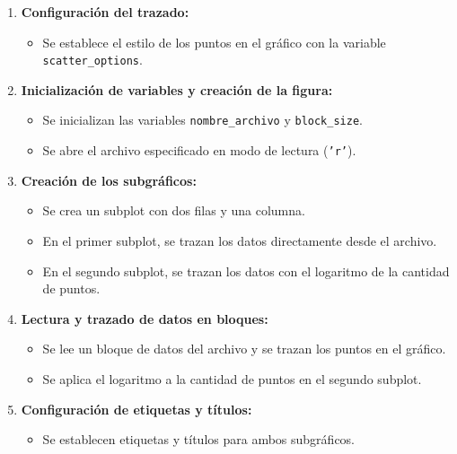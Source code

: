\documentclass{article}
\begin{document}
            \begin{enumerate}
                \item \textbf{Configuración del trazado:}
                \begin{itemize}
                    \item Se establece el estilo de los puntos en el gráfico con la variable \texttt{scatter\_options}.
                \end{itemize}

                \item \textbf{Inicialización de variables y creación de la figura:}
                \begin{itemize}
                    \item Se inicializan las variables \texttt{nombre\_archivo} y \texttt{block\_size}.
                    \item Se abre el archivo especificado en modo de lectura (\texttt{'r'}).
                \end{itemize}

                \item \textbf{Creación de los subgráficos:}
                \begin{itemize}
                    \item Se crea un subplot con dos filas y una columna.
                    \item En el primer subplot, se trazan los datos directamente desde el archivo.
                    \item En el segundo subplot, se trazan los datos con el logaritmo de la cantidad de puntos.
                \end{itemize}

                \item \textbf{Lectura y trazado de datos en bloques:}
                \begin{itemize}
                    \item Se lee un bloque de datos del archivo y se trazan los puntos en el gráfico.
                    \item Se aplica el logaritmo a la cantidad de puntos en el segundo subplot.
                \end{itemize}

                \item \textbf{Configuración de etiquetas y títulos:}
                \begin{itemize}
                    \item Se establecen etiquetas y títulos para ambos subgráficos.
                \end{itemize}


\end{enumerate}
\end{document}

